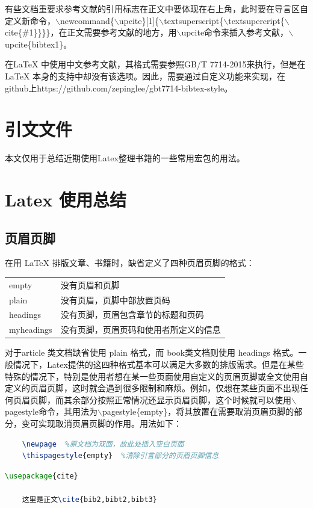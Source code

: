 \documentclass[12pt]{book}
\begin{document}
有些文档重要求参考文献的引用标志在正文中要体现在右上角，此时要在导言区自定义新命令，$\backslash$newcommand\{$\backslash$upcite\}[1]\{$\backslash$textsuperscript\{$\backslash$textsupercript\{$\backslash$cite\{\#1\}\}\}\}，在正文需要参考文献的地方，用$\backslash$upcite命令来插入参考文献，$\backslash$upcite\{bibtex1\}。


在LaTeX{} 中使用中文参考文献，其格式需要参照GB/T 7714-2015来执行，但是在LaTeX{} 本身的支持中却没有该选项。因此，需要通过自定义功能来实现，在github上https://github.com/zepinglee/gbt7714-bibtex-style。


\section{引文文件}

本文仅用于总结近期使用Latex整理书籍的一些常用宏包的用法。

\section*{Latex 使用总结}

\subsection{页眉页脚}

在用 LaTeX 排版文章、书籍时，缺省定义了四种页眉页脚的格式：

\begin{table}[h]
	\centering
	\begin{tabular}{ll}
		empty      & 没有页眉和页脚              \\
		plain      & 没有页眉，页脚中部放置页码        \\
		headings   & 没有页脚，页眉包含章节的标题和页码    \\
		myheadings & 没有页脚，页眉页码和使用者所定义的信息 
	\end{tabular}
\end{table}

对于article 类文档缺省使用 plain 格式，而 book类文档则使用 headings 格式。一般情况下，Latex提供的这四种格式基本可以满足大多数的排版需求。但是在某些特殊的情况下，特别是使用者想在某一些页面使用自定义的页眉页脚或全文使用自定义的页眉页脚，这时就会遇到很多限制和麻烦。例如，仅想在某些页面不出现任何页眉页脚，而其余部分按照正常情况还显示页眉页脚，这个时候就可以使用$\backslash$pagestyle命令，其用法为$\backslash$pagestyle\{empty\}，将其放置在需要取消页眉页脚的部分，变可实现取消页眉页脚的作用。用法如下：
\begin{lstlisting}[language=tex]
	%   %引言部分
	\newpage  %原文档为双面，故此处插入空白页面
	\thispagestyle{empty}  %清除引言部分的页眉页脚信息
\end{lstlisting}
\begin{lstlisting}[language=tex]
	\usepackage{cite}
	
	这里是正文\cite{bib2,bibt2,bibt3}
\end{lstlisting}
\end{document}
